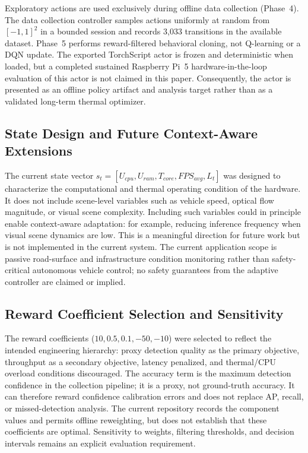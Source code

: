 \documentclass{ieeeaccess}
\begin{document}
\begin{highlight}
Exploratory actions are used exclusively during offline data collection
(Phase~4). The data collection controller samples actions uniformly at random
from $[-1,1]^2$ in a bounded session and records 3,033 transitions in the
available dataset. Phase~5 performs reward-filtered behavioral cloning, not
Q-learning or a DQN update. The exported TorchScript actor is frozen and
deterministic when loaded, but a completed sustained Raspberry Pi~5
hardware-in-the-loop evaluation of this actor is not claimed in this paper.
Consequently, the actor is presented as an offline policy artifact and
analysis target rather than as a validated long-term thermal optimizer.
\end{highlight}

\subsection{State Design and Future Context-Aware Extensions}

The current state vector $s_t = [U_{cpu}, U_{ram}, T_{core}, FPS_{avg},
L_t]$ was designed to characterize the computational and thermal operating
condition of the hardware. It does not include scene-level variables such
as vehicle speed, optical flow magnitude, or visual scene complexity.
Including such variables could in principle enable context-aware adaptation:
for example, reducing inference frequency when visual scene dynamics are low.
This is a meaningful direction for future work but is not implemented in the
current system. The current application scope is passive road-surface and
infrastructure condition monitoring rather than safety-critical autonomous
vehicle control; no safety guarantees from the adaptive controller are
claimed or implied.

\subsection{Reward Coefficient Selection and Sensitivity}

\begin{highlight}
The reward coefficients ($10, 0.5, 0.1, -50, -10$) were selected to
reflect the intended engineering hierarchy: proxy detection quality as the
primary objective, throughput as a secondary objective, latency penalized,
and thermal/CPU overload conditions discouraged. The accuracy term is the
maximum detection confidence in the collection pipeline; it is a proxy, not
ground-truth accuracy. It can therefore reward confidence calibration errors
and does not replace AP, recall, or missed-detection analysis. The current
repository records the component values and permits offline reweighting, but
does not establish that these coefficients are optimal. Sensitivity to
weights, filtering thresholds, and decision intervals remains an explicit
evaluation requirement.
\end{highlight}
\end{document}
